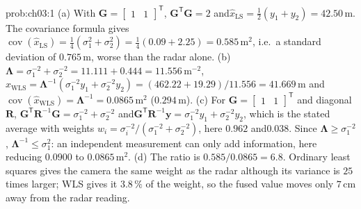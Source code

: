 
\begin{sol}{prob:ch03:1}
(a) With $\mathbf{G}=\begin{bmatrix}1&1\end{bmatrix}^{\mathsf T}$, $\mathbf{G}^{\mathsf T}\mathbf{G}=2$ and\allowbreak $\widehat{x}_{\mathrm{LS}}=\tfrac12(y_1+y_2)=42.50$\,m. The covariance formula gives $\operatorname{cov}(\widehat{x}_{\mathrm{LS}})=\tfrac14(\sigma_1^{2}+\sigma_2^{2})=\tfrac14(0.09+2.25)=0.585$\,m$^{2}$, i.e.\ a standard deviation of $0.765$\,m, worse than the radar alone.
(b) $\mathbf{\Lambda}=\sigma_1^{-2}+\sigma_2^{-2}=11.111+0.444=11.556$\,m$^{-2}$, $\widehat{x}_{\mathrm{WLS}}=\mathbf{\Lambda}^{-1}(\sigma_1^{-2}y_1+\sigma_2^{-2}y_2)=(462.22+19.29)/11.556=41.669$\,m and $\operatorname{cov}(\widehat{x}_{\mathrm{WLS}})=\mathbf{\Lambda}^{-1}=0.0865$\,m$^{2}$ ($0.294$\,m).
(c) For $\mathbf{G}=\begin{bmatrix}1&1\end{bmatrix}^{\mathsf T}$ and diagonal $\mathbf{R}$, $\mathbf{G}^{\mathsf T}\mathbf{R}^{-1}\mathbf{G}=\sigma_1^{-2}+\sigma_2^{-2}$ and\allowbreak $\mathbf{G}^{\mathsf T}\mathbf{R}^{-1}\mathbf{y}=\sigma_1^{-2}y_1+\sigma_2^{-2}y_2$, which is the stated average with weights $w_i=\sigma_i^{-2}/(\sigma_1^{-2}+\sigma_2^{-2})$, here $0.962$ and\allowbreak $0.038$. Since $\mathbf{\Lambda}\ge\sigma_1^{-2}$, $\mathbf{\Lambda}^{-1}\le\sigma_1^{2}$: an independent measurement can only add information, here reducing $0.0900$ to $0.0865$\,m$^{2}$.
(d) The ratio is $0.585/0.0865=6.8$. Ordinary least squares gives the camera the same weight as the radar although its variance is $25$ times larger; WLS gives it $3.8\,\%$ of the weight, so the fused value moves only $7$\,cm away from the radar reading.
\end{sol}

